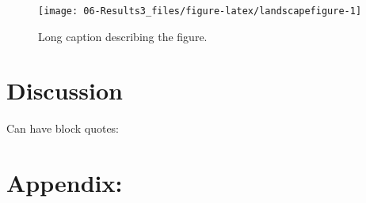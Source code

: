 \documentclass[12pt,]{book}
\begin{document}
\pagebreak
\clearpage 
\begin{landscape}

\begin{figure}
\texttt{[image: 06-Results3\_files/figure-latex/landscapefigure-1]} \caption[Landscape figure: short caption for LoF]{Long caption describing the figure.}\label{fig:landscapefigure}
\end{figure}

\end{landscape}
\clearpage
\pagebreak
\restoregeometry

\hypertarget{discussion}{%
\chapter{Discussion}\label{discussion}}

Can have block quotes:

\begin{quote}
\blindtext
\end{quote}

\hypertarget{Appendix1}{%
\chapter{Appendix:}\label{Appendix1}}


\end{document}

